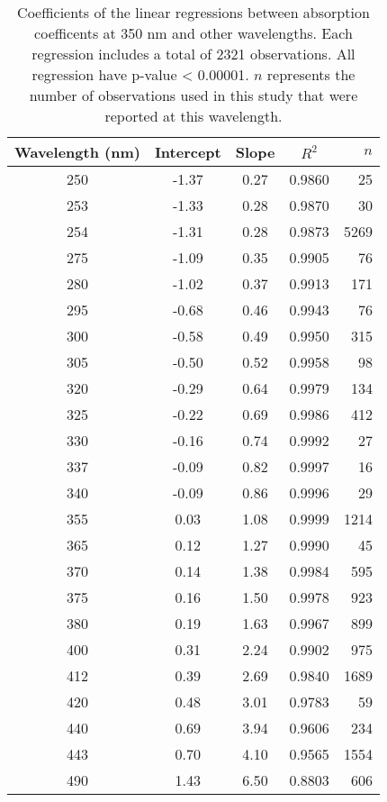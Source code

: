 \begin{table}[ht]
\centering
\begin{tabular}{ccccr}
  \hline
Wavelength (nm) & Intercept & Slope & $R^2$ & $n$ \\ 
  \hline
250 & -1.37 & 0.27 & 0.9860 & 25 \\ 
  253 & -1.33 & 0.28 & 0.9870 & 30 \\ 
  254 & -1.31 & 0.28 & 0.9873 & 5269 \\ 
  275 & -1.09 & 0.35 & 0.9905 & 76 \\ 
  280 & -1.02 & 0.37 & 0.9913 & 171 \\ 
  295 & -0.68 & 0.46 & 0.9943 & 76 \\ 
  300 & -0.58 & 0.49 & 0.9950 & 315 \\ 
  305 & -0.50 & 0.52 & 0.9958 & 98 \\ 
  320 & -0.29 & 0.64 & 0.9979 & 134 \\ 
  325 & -0.22 & 0.69 & 0.9986 & 412 \\ 
  330 & -0.16 & 0.74 & 0.9992 & 27 \\ 
  337 & -0.09 & 0.82 & 0.9997 & 16 \\ 
  340 & -0.09 & 0.86 & 0.9996 & 29 \\ 
  355 & 0.03 & 1.08 & 0.9999 & 1214 \\ 
  365 & 0.12 & 1.27 & 0.9990 & 45 \\ 
  370 & 0.14 & 1.38 & 0.9984 & 595 \\ 
  375 & 0.16 & 1.50 & 0.9978 & 923 \\ 
  380 & 0.19 & 1.63 & 0.9967 & 899 \\ 
  400 & 0.31 & 2.24 & 0.9902 & 975 \\ 
  412 & 0.39 & 2.69 & 0.9840 & 1689 \\ 
  420 & 0.48 & 3.01 & 0.9783 & 59 \\ 
  440 & 0.69 & 3.94 & 0.9606 & 234 \\ 
  443 & 0.70 & 4.10 & 0.9565 & 1554 \\ 
  490 & 1.43 & 6.50 & 0.8803 & 606 \\ 
   \hline
\end{tabular}
\caption{Coefficients of the linear regressions between absorption 
coefficents at 350 nm and other wavelengths. Each regression includes a total 
of 2321 observations. All regression have p-value < 0.00001.  $n$ represents 
the number of observations used in this study that were reported at this 
wavelength.} 
\end{table}
